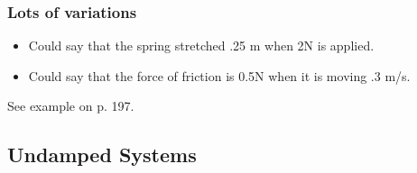 \begin{frame}
  \frametitle{Lots of variations}

  \begin{itemize}
  \item Could say that the spring stretched .25 m when 2N is applied.
  \item Could say that the force of friction is 0.5N when it is moving
    .3 m/s.
  \end{itemize}

  See example on p. 197.

\end{frame}

\subsection{Undamped Systems}

